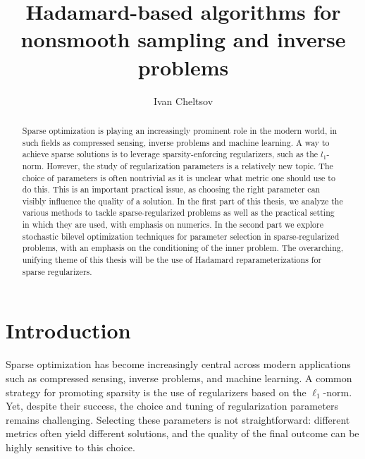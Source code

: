 \documentclass[11pt, twoside]{report}
\title{Hadamard-based algorithms for nonsmooth sampling and inverse problems}
\author{Ivan Cheltsov}
\begin{document}
\maketitle

\begin{abstract}
    Sparse optimization is playing an increasingly prominent role in the modern world, in such fields as compressed sensing, inverse problems and machine learning. A way to achieve sparse solutions is to leverage sparsity-enforcing regularizers, such as the $l_1$-norm. However, the study of regularization parameters is a relatively new topic. The choice of parameters is often nontrivial as it is unclear what metric one should use to do this. This is an important practical issue, as choosing the right parameter can visibly influence the quality of a solution.  In the first part of this thesis, we analyze the various methods to tackle sparse-regularized problems as well as the practical setting in which they are used, with emphasis on numerics. In the second part we explore stochastic bilevel optimization techniques for parameter selection in sparse-regularized problems, with an emphasis on the conditioning of the inner problem. The overarching, unifying theme of this thesis will be the use of Hadamard reparameterizations for sparse regularizers.


\end{abstract}

\tableofcontents

\part*{Introduction}
Sparse optimization has become increasingly central across modern applications such as
compressed sensing, inverse problems, and machine learning. A common strategy for promoting
sparsity is the use of regularizers based on the $\ell_1$-norm. Yet, despite their success, the
choice and tuning of regularization parameters remains challenging. Selecting these parameters
is not straightforward: different metrics often yield different solutions, and the quality of the
final outcome can be highly sensitive to this choice.
\end{document}
